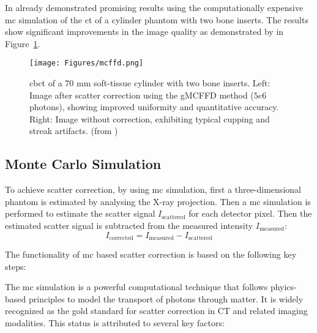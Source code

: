 In \citeyear{mcffd2011} \citeauthor{mcffd2011} \cite{mcffd2011} already
demonstrated promising results using the computationally expensive \ac{mc}
simulation of the \ac{ct} of a cylinder phantom with two bone inserts. The
results show significant improvements in the image quality as demonstrated by
\citeauthor{mcffd2011} in Figure~\ref{fig:scatter_correction_comparison}.

\captionsetup{justification=justified,singlelinecheck=false}
\begin{figure}[H]
    \centering
    \texttt{[image: Figures/mcffd.png]}
    \caption{\ac{cbct} of a 70 mm soft-tissue cylinder with two bone inserts.
    Left: Image after scatter correction using the gMCFFD method ($5e6$
    photons), showing improved uniformity and quantitative accuracy. Right:
    Image without correction, exhibiting typical cupping and streak artifacts.
    (from \cite{mcffd2011})}
    \label{fig:scatter_correction_comparison}
\end{figure}

\subsection{Monte Carlo Simulation}

To achieve scatter correction, by using \ac{mc} simulation, first a three-dimensional phantom is estimated by analysing the X-ray projection. Then a \ac{mc} simulation is performed to estimate the scatter signal $I_\text{scattered}$ for each detector pixel. Then the estimated scatter signal is subtracted from the measured intensity $I_\text{measured}$:
\begin{equation}
    \label{eq:scatter_correction}
    I_{\text{corrected}} = I_\text{measured} - I_\text{scattered}
\end{equation}

The functionality of \ac{mc} based scatter correction is based on the following key steps:

The \ac{mc} simulation is a powerful computational technique that follows
phyics-based principles to model the transport of photons through matter. It is
widely recognized as the gold standard for scatter correction in CT and related
imaging modalities. This status is attributed to several key factors:

